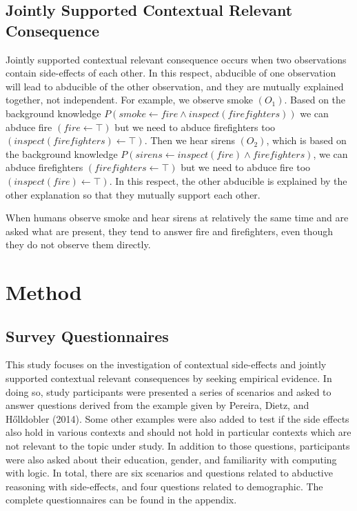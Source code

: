 \documentclass[]{interact}
\theoremstyle{plain}%
\theoremstyle{definition}
\theoremstyle{remark}
\begin{document}
\subsection{Jointly Supported Contextual Relevant Consequence}

Jointly supported contextual relevant consequence occurs when two observations contain side-effects of each other. In this respect, abducible of one observation will lead to abducible of the other observation, and they are mutually explained together, not independent. For example, we observe smoke \( (O_{1}) \). Based on the background knowledge \( P ( smoke \leftarrow  fire \wedge  inspect(firefighters) ) \) we can abduce fire \( (fire \leftarrow  \top) \) but we need to abduce firefighters too \( (inspect(firefighters) \leftarrow  \top) \). Then we hear sirens \( (O_{2}) \), which is based on the background knowledge \( P (sirens \leftarrow  inspect(fire) \wedge  firefighters) \), we can abduce firefighters \( (firefighters \leftarrow  \top) \) but we need to abduce fire too \( (inspect(fire) \leftarrow  \top) \). In this respect, the other abducible is explained by the other explanation so that they mutually support each other.

When humans observe smoke and hear sirens at relatively the same time and are asked what are present, they tend to answer fire and firefighters, even though they do not observe them directly. 

\section{Method}

\subsection{Survey Questionnaires}

This study focuses on the investigation of contextual side-effects and jointly supported contextual relevant consequences by seeking empirical evidence. In doing so, study participants were presented a series of scenarios and asked to answer questions derived from the example given by Pereira, Dietz, and Hőlldobler (2014). Some other examples were also added to test if the side effects also hold in various contexts and should not hold in particular contexts which are not relevant to the topic under study. In addition to those questions, participants were also asked about their education, gender, and familiarity with computing with logic. In total, there are six scenarios and questions related to abductive reasoning with side-effects, and four questions related to demographic. The complete questionnaires can be found in the appendix.
\end{document}
